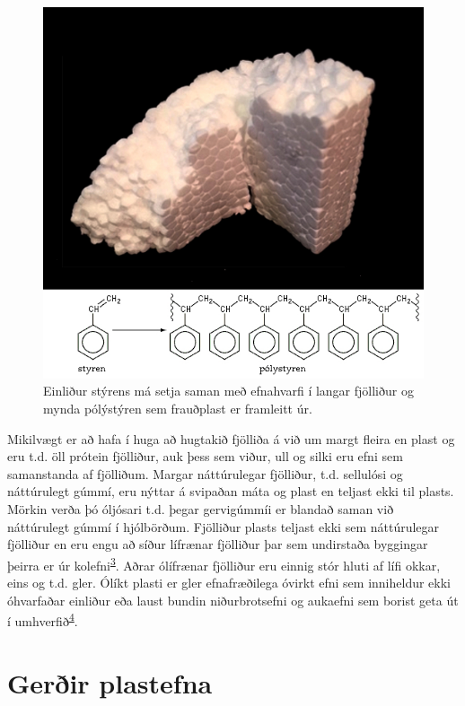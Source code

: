 \documentclass[icelandic,]{book}
\begin{document}
\begin{figure}

{\centering \includegraphics[width=0.7\linewidth]{myndir/polystyrene} 

}

\caption{Einliður stýrens má setja saman með efnahvarfi í langar fjölliður og mynda pólýstýren sem frauðplast er framleitt úr.}\label{fig:styren}
\end{figure}

Mikilvægt er að hafa í huga að hugtakið fjölliða á við um margt fleira en plast og eru t.d. öll prótein fjölliður, auk þess sem viður, ull og silki eru efni sem samanstanda af fjölliðum. Margar náttúrulegar fjölliður, t.d. sellulósi og náttúrulegt gúmmí, eru nýttar á svipaðan máta og plast en teljast ekki til plasts. Mörkin verða þó óljósari t.d. þegar gervigúmmíi er blandað saman við náttúrulegt gúmmí í hjólbörðum. Fjölliður plasts teljast ekki sem náttúrulegar fjölliður en eru engu að síður lífrænar fjölliður þar sem undirstaða byggingar þeirra er úr kolefni\textsuperscript{\protect\hyperlink{ref-Gowariker2005}{3}}. Aðrar ólífrænar fjölliður eru einnig stór hluti af lífi okkar, eins og t.d. gler. Ólíkt plasti er gler efnafræðilega óvirkt efni sem inniheldur ekki óhvarfaðar einliður eða laust bundin niðurbrotsefni og aukaefni sem borist geta út í umhverfið\textsuperscript{\protect\hyperlink{ref-Gudjonsdottir2015}{4}}.

\hypertarget{gerir-plastefna}{%
\section*{Gerðir plastefna}\label{gerir-plastefna}}
\end{document}
